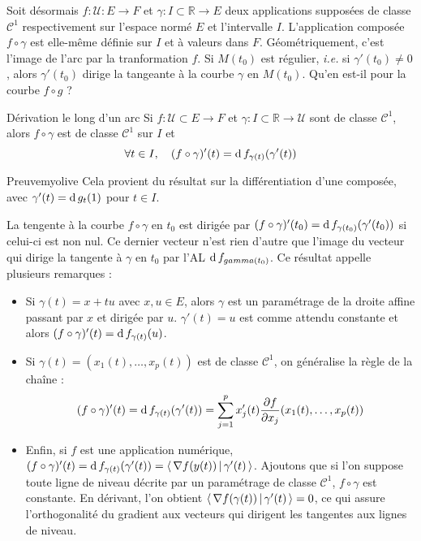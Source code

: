     Soit désormais $f : \mathcal{U} : E \to F$ et $\gamma : I \subset \mathbb{R} \to E$ deux applications supposées de classe $\mathcal{C}^1$ respectivement sur l’espace normé $E$ et l’intervalle $I$. L’application composée $f \circ \gamma$ est elle-même définie sur $I$ et à valeurs dans $F$. Géométriquement, c’est l’image de l’arc par la tranformation $f$. Si $M(t_0)$ est régulier, \textit{i.e.} si $\gamma'(t_0) \neq 0$, alors $\gamma'(t_0)$ dirige la tangeante à la courbe $\gamma$ en $M(t_0)$. Qu’en est-il pour la courbe $f \circ g$ ?

    \begin{prop}{Dérivation le long d’un arc}{}
        Si $f : \mathcal{U} \subset E \to F$ et $\gamma : I \subset \mathbb{R} \to \mathcal{U}$ sont de classe $\mathcal{C}^1$, alors $f \circ \gamma$ est de classe $\mathcal{C}^1$ sur $I$ et 
        \[ \forall t \in I, \quad (f \circ \gamma)'(t) = \operatorname{d} f_{\gamma(t)}(\gamma'(t)) \]   
    \end{prop}

    \begin{demo}{Preuve}{myolive}
        Cela provient du résultat sur la différentiation d’une composée, avec $\gamma'(t) = \operatorname{d} g_t(1)$ pour $t \in I$.
    \end{demo}

    La tengente à la courbe $f \circ \gamma$ en $t_0$ est dirigée par $(f \circ \gamma)'(t_0) = \operatorname{d} f_{\gamma(t_0)}(\gamma'(t_0))$ si celui-ci est non nul. Ce dernier vecteur n’est rien d’autre que l’image du vecteur qui dirige la tangente à $\gamma$ en $t_0$ par l’AL $\operatorname{d} f_{gamma(t_0)}$. Ce résultat appelle plusieurs remarques :
    \begin{itemize}
        \item Si $\gamma(t) = x + tu$ avec $x,u \in E$, alors $\gamma$ est un paramétrage de la droite affine passant par $x$ et dirigée par $u$. $\gamma'(t) = u$ est comme attendu constante et alors $(f \circ \gamma)'(t) = \operatorname{d} f_{\gamma(t)}(u)$. 
        \item Si $\gamma(t) = (x_1(t), \ldots, x_p(t))$ est de classe $\mathcal{C}^1$, on généralise la règle de la chaîne :
        \[ (f \circ \gamma)'(t) = \operatorname{d} f_{\gamma(t)}(\gamma'(t)) = \sum_{j=1}^{p} x_j'(t) \frac{\partial f}{\partial x_j}(x_1(t), \ldots, x_p(t)) \]   
        \item Enfin, si $f$ est une application numérique, $(f \circ \gamma)'(t) = \operatorname{d} f_{\gamma(t)}(\gamma'(t)) = \left<\,\nabla f(y(t))\,\middle|\,\gamma'(t)\,\right>$. Ajoutons que si l’on suppose toute ligne de niveau décrite par un paramétrage de classe $\mathcal{C}^1$, $f \circ \gamma$ est constante. En dérivant, l’on obtient $\left<\,\nabla f(\gamma(t))\,\middle|\,\gamma'(t)\,\right> = 0$, ce qui assure l’orthogonalité du gradient aux vecteurs qui dirigent les tangentes aux lignes de niveau.
    \end{itemize}

